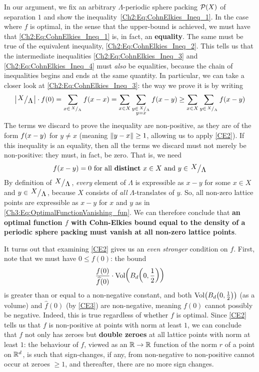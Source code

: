 In our argument, we fix an arbitrary $\Lambda$-periodic sphere packing $\mathcal{P}(X)$ of separation $1$ and show the inequality~\eqref{Ch2:Eq:CohnElkies_Ineq_1}. In the case where $f$ is optimal, in the sense that the upper-bound is achieved, we must have that \eqref{Ch2:Eq:CohnElkies_Ineq_1} is, in fact, an \textbf{equality}. The same must be true of the equivalent inequality, \eqref{Ch2:Eq:CohnElkies_Ineq_2}. This tells us that the intermediate inequalities \eqref{Ch2:Eq:CohnElkies_Ineq_3} and \eqref{Ch2:Eq:CohnElkies_Ineq_4} must \textit{also} be equalities, because the chain of inequalities begins and ends at the same quantity. In particular, we can take a closer look at \eqref{Ch2:Eq:CohnElkies_Ineq_3}: the way we prove it is by writing
\begin{align*}
    \abs{\quotient{X}{\Lambda}}  \cdot f(0)
    = \sum_{x \in {\tiny{\quotient{X}{\Lambda}}}} \fof{x - x}
    = \sum_{x \in X} \sum_{\substack{y \in {\tiny \quotient{X}{\Lambda}} \\ y = x}} \fof{x - y}
    \geq \sum_{x \in X} \sum_{y \in {\tiny \quotient{X}{\Lambda}}} \fof{x - y}
\end{align*}
The terms we discard to prove the inequality are non-positive, as they are of the form $f\!\left( x - y \right)$ for $y \neq x$ (meaning $\left\lVert y - x \right\rVert \geq 1$, allowing us to apply \ref{CE2}). If this inequality is an equality, then all the terms we discard must not merely be non-positive: they must, in fact, be zero. That is, we need
\begin{align}
    \fof{x - y} = 0 \text{ for all \textbf{distinct} } x \in X \text{ and } y \in \quotient{X}{\Lambda}
    \label{Ch3:Eq:OptimalFunctionVanishing_fun}
\end{align}
By definition of $\quotient{X}{\Lambda}$, \textit{every} element of $\Lambda$ is expressible as $x - y$ for some $x \in X$ and $y \in \quotient{X}{\Lambda}$, because $X$ consists of \textit{all} $\Lambda$-translates of $y$. So, all non-zero lattice points are expressible as $x - y$ for $x$ and $y$ as in \eqref{Ch3:Eq:OptimalFunctionVanishing_fun}. We can therefore conclude that \textbf{an optimal function $f$ with Cohn-Elkies bound equal to the density of a periodic sphere packing must vanish at all non-zero lattice points}.

It turns out that examining \ref{CE2} gives us an \textit{even stronger} condition on $f$. First, note that we must have $0 \leq f(0)$: the bound
\begin{align*}
    \frac{f(0)}{\widehat{f}(0)} \cdot \operatorname{Vol}\!\left( B_d\!\left( 0, \frac{1}{2} \right) \right)
\end{align*}
is greater than or equal to a non-negative constant, and both $\operatorname{Vol}\!\left( B_d\!\left( 0, \frac{1}{2} \right) \right)$ (as a volume) and $\hat{f}(0)$ (by \ref{CE3}) are non-negative, meaning $f(0)$ cannot possibly be negative. Indeed, this is true regardless of whether $f$ is optimal. Since \ref{CE2} tells us that $f$ is non-positive at points with norm at least $1$, we can conclude that $f$ not only has zeroes but \textbf{double zeroes} at all lattice points with norm at least $1$: the behaviour of $f$, viewed as an $\mathbb{R} \to \mathbb{R}$ function of the norm $r$ of a point on $\mathbb{R}^d$, is such that sign-changes, if any, from non-negative to non-positive cannot occur at zeroes $\geq 1$, and thereafter, there are no more sign changes.

